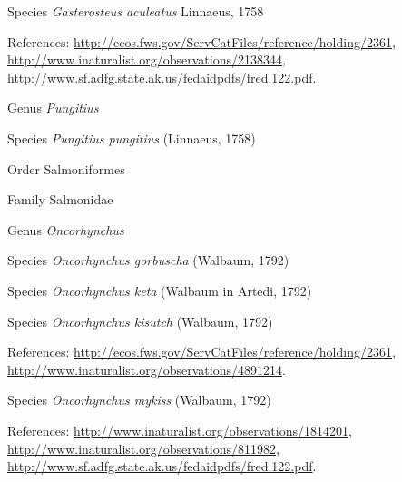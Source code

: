 \documentclass[9pt, article]{memoir}
\begin{document}
\begin{multicols}{2}
\vspace{6pt}\noindent\hspace{36pt}Species \textit{Gasterosteus aculeatus} Linnaeus, 1758


\vspace{6pt}References: 
\url{http://ecos.fws.gov/ServCatFiles/reference/holding/2361}, 
\url{http://www.inaturalist.org/observations/2138344}, 
\url{http://www.sf.adfg.state.ak.us/fedaidpdfs/fred.122.pdf}.

\vspace{6pt}\noindent\hspace{30pt}Genus \textit{Pungitius}


\vspace{6pt}\noindent\hspace{36pt}Species \textit{Pungitius pungitius} (Linnaeus, 1758)


\vspace{6pt}\noindent\hspace{18pt}Order Salmoniformes


\vspace{6pt}\noindent\hspace{24pt}Family Salmonidae


\vspace{6pt}\noindent\hspace{30pt}Genus \textit{Oncorhynchus}


\vspace{6pt}\noindent\hspace{36pt}Species \textit{Oncorhynchus gorbuscha} (Walbaum, 1792)


\vspace{6pt}\noindent\hspace{36pt}Species \textit{Oncorhynchus keta} (Walbaum in Artedi, 1792)


\vspace{6pt}\noindent\hspace{36pt}Species \textit{Oncorhynchus kisutch} (Walbaum, 1792)


\vspace{6pt}References: 
\url{http://ecos.fws.gov/ServCatFiles/reference/holding/2361}, 
\url{http://www.inaturalist.org/observations/4891214}.

\vspace{6pt}\noindent\hspace{36pt}Species \textit{Oncorhynchus mykiss} (Walbaum, 1792)


\vspace{6pt}References: 
\url{http://www.inaturalist.org/observations/1814201}, 
\url{http://www.inaturalist.org/observations/811982}, 
\url{http://www.sf.adfg.state.ak.us/fedaidpdfs/fred.122.pdf}.


\end{multicols}
\end{document}
